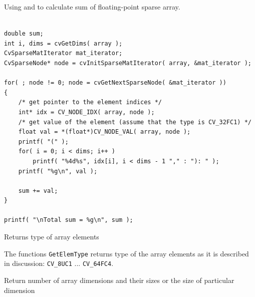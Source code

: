 Using  and  to calculate sum of floating-point sparse array.

\begin{lstlisting}

double sum;
int i, dims = cvGetDims( array );
CvSparseMatIterator mat_iterator;
CvSparseNode* node = cvInitSparseMatIterator( array, &mat_iterator );

for( ; node != 0; node = cvGetNextSparseNode( &mat_iterator ))
{
    /* get pointer to the element indices */
    int* idx = CV_NODE_IDX( array, node );
    /* get value of the element (assume that the type is CV_32FC1) */
    float val = *(float*)CV_NODE_VAL( array, node );
    printf( "(" );
    for( i = 0; i < dims; i++ )
        printf( "%4d%s", idx[i], i < dims - 1 "," : "): " );
    printf( "%g\n", val );

    sum += val;
}

printf( "\nTotal sum = %g\n", sum );

\end{lstlisting}


\label{GetElemType}

Returns type of array elements


\begin{description}
\end{description}


The functions \texttt{GetElemType} returns type of the array elements
as it is described in  discussion: \texttt{CV\_8UC1}
... \texttt{CV\_64FC4}.


\label{GetDims, GetDimSize}

Return number of array dimensions and their sizes or the size of particular dimension


\begin{description}
\end{description}


